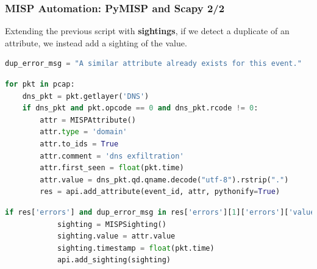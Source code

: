 \begin{frame}[fragile]
    \frametitle{MISP Automation: PyMISP and Scapy 2/2}    
    {\small Extending the previous script with {\bf sightings}, if we detect a duplicate of an attribute, we instead add a sighting of the value.}
    \linebreak
    \begin{lstlisting}[basicstyle=\tiny\color{black},language=Python]
dup_error_msg = "A similar attribute already exists for this event."
	\end{lstlisting}
	\begin{lstlisting}[basicstyle=\tiny\color{gray},language=Python]
for pkt in pcap:
    dns_pkt = pkt.getlayer('DNS')
    if dns_pkt and pkt.opcode == 0 and dns_pkt.rcode != 0:
        attr = MISPAttribute()
        attr.type = 'domain'
        attr.to_ids = True
        attr.comment = 'dns exfiltration'
        attr.first_seen = float(pkt.time)
        attr.value = dns_pkt.qd.qname.decode("utf-8").rstrip(".")
        res = api.add_attribute(event_id, attr, pythonify=True)
	\end{lstlisting}
	\begin{lstlisting}[basicstyle=\tiny\color{black},language=Python]
        if res['errors'] and dup_error_msg in res['errors'][1]['errors']['value']:
            sighting = MISPSighting()
            sighting.value = attr.value
            sighting.timestamp = float(pkt.time)
            api.add_sighting(sighting)
	\end{lstlisting}
\end{frame}

